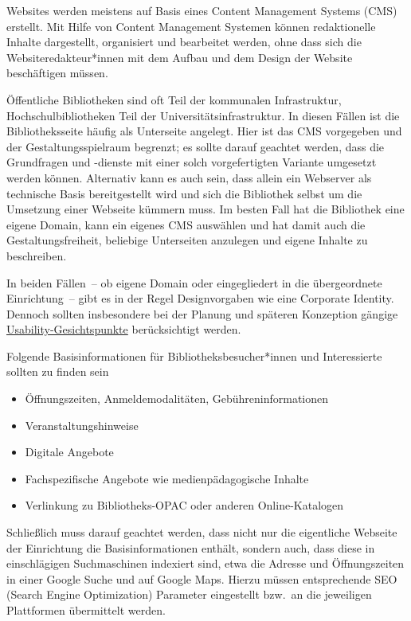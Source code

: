 \documentclass[
  11pt,
  letterpaper,
  DIV=11,
  twoside]{scrreprt}
\providecommand{\tightlist}{%
  \setlength{\itemsep}{0pt}\setlength{\parskip}{0pt}}\usepackage{longtable,booktabs,array}
\begin{document}
Websites werden meistens auf Basis eines Content Management Systems
(CMS) erstellt. Mit Hilfe von Content Management Systemen können
redaktionelle Inhalte dargestellt, organisiert und bearbeitet werden,
ohne dass sich die Websiteredakteur*innen mit dem Aufbau und dem Design
der Website beschäftigen müssen.

Öffentliche Bibliotheken sind oft Teil der kommunalen Infrastruktur,
Hochschulbibliotheken Teil der Universitätsinfrastruktur. In diesen
Fällen ist die Bibliotheksseite häufig als Unterseite angelegt. Hier ist
das CMS vorgegeben und der Gestaltungsspielraum begrenzt; es sollte
darauf geachtet werden, dass die Grundfragen und -dienste mit einer
solch vorgefertigten Variante umgesetzt werden können. Alternativ kann
es auch sein, dass allein ein Webserver als technische Basis
bereitgestellt wird und sich die Bibliothek selbst um die Umsetzung
einer Webseite kümmern muss. Im besten Fall hat die Bibliothek eine
eigene Domain, kann ein eigenes CMS auswählen und hat damit auch die
Gestaltungsfreiheit, beliebige Unterseiten anzulegen und eigene Inhalte
zu beschreiben.

In beiden Fällen~-- ob eigene Domain oder eingegliedert in die
übergeordnete Einrichtung~-- gibt es in der Regel Designvorgaben wie
eine Corporate Identity. Dennoch sollten insbesondere bei der Planung
und späteren Konzeption gängige
\hyperref[was-beeinflusst-den-nutzungseindruck]{Usability-Gesichtspunkte}
berücksichtigt werden.

Folgende Basisinformationen für Bibliotheksbesucher*innen und
Interessierte sollten zu finden sein

\begin{itemize}
\tightlist
\item
  Öffnungszeiten, Anmeldemodalitäten, Gebühreninformationen
\item
  Veranstaltungshinweise
\item
  Digitale Angebote
\item
  Fachspezifische Angebote wie medienpädagogische Inhalte
\item
  Verlinkung zu Bibliotheks-OPAC oder anderen Online-Katalogen
\end{itemize}

Schließlich muss darauf geachtet werden, dass nicht nur die eigentliche
Webseite der Einrichtung die Basisinformationen enthält, sondern auch,
dass diese in einschlägigen Suchmaschinen indexiert sind, etwa die
Adresse und Öffnungszeiten in einer Google Suche und auf Google Maps.
Hierzu müssen entsprechende SEO (Search Engine Optimization) Parameter
eingestellt bzw.~an die jeweiligen Plattformen übermittelt werden.
\end{document}
